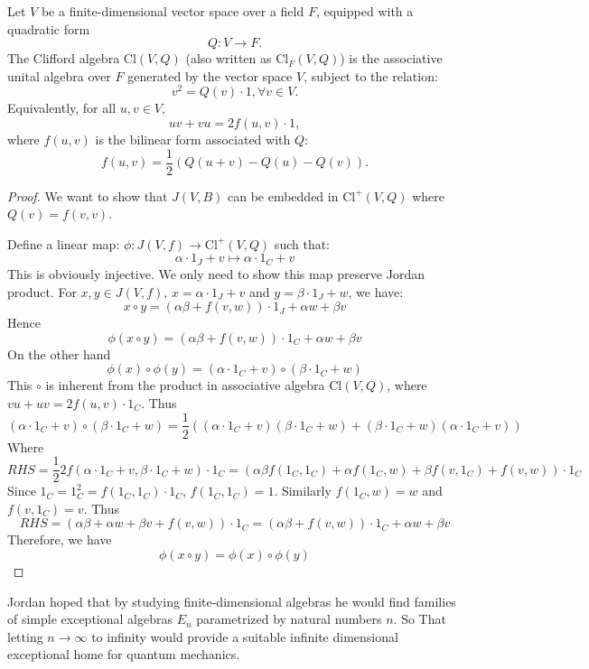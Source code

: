 \documentclass{article}
\begin{document}
\begin{definition} 
Let $ V $ be a finite-dimensional vector space over a field $ F $, equipped with a quadratic form
\[
Q : V \to F.
\]
The Clifford algebra $ \mathrm{Cl}(V, Q) $ (also written as $ \mathrm{Cl}_F(V, Q) $) is the associative unital algebra over $ F $ generated by the vector space $ V $, subject to the relation:
\[
v^2 = Q(v) \cdot 1 , \forall  v \in V.
\]
Equivalently, for all $ u, v \in V $,
\[
uv + vu = 2 f(u,v) \cdot 1,
\]
where $ f(u,v) $ is the bilinear form associated with $ Q $:
\[
f(u,v) = \frac{1}{2}(Q(u+v) - Q(u) - Q(v)).
\]
\end{definition}

\begin{proof} 
We want to show that $ J(V,B) $ can be embedded in $ \mathrm{Cl}^+(V, Q) $ where $ Q(v)=f(v,v) $.     

Define a linear map: $ \phi: J(V,f) \rightarrow \mathrm{Cl}^+(V, Q) $ such that:
\[
\alpha \cdot 1_J + v \mapsto \alpha \cdot 1_C + v
\] 
This is obviously injective. We only need to show this map preserve Jordan product. For $ x,y \in J(V,f) $, $ x=\alpha \cdot 1_J + v $ and $ y=\beta \cdot 1_J + w $, we have:
\[
x \circ y = (\alpha \beta + f(v,w)) \cdot 1_J + \alpha w + \beta v 
\]
Hence
\[
\phi(x \circ y) = (\alpha \beta + f(v,w)) \cdot 1_C + \alpha w + \beta v 
\]
On the other hand
\[
\phi(x) \circ \phi(y) = (\alpha \cdot 1_C + v) \circ (\beta \cdot 1_C + w )
\]
This $ \circ $ is inherent from the product in associative algebra $ \mathrm{Cl}(V,Q) $, where $ vu+uv=2f(u,v) \cdot 1_C $. Thus
\[
(\alpha \cdot 1_C + v) \circ (\beta \cdot 1_C + w )=\frac{1}{2}((\alpha \cdot 1_C + v)(\beta \cdot 1_C + w )+(\beta \cdot 1_C + w )(\alpha \cdot 1_C + v))
\]    
Where
\[
RHS=\frac{1}{2}2f(\alpha \cdot 1_C + v,\beta \cdot 1_C + w ) \cdot 1_C=(\alpha \beta f(1_C,1_C)+\alpha f(1_C,w) +\beta f(v,1_C)+f(v,w)) \cdot 1_C
\]
Since $ 1_C=1_C^2=f(1_C,1_C) \cdot 1_C $, $ f(1_C,1_C)=1 $. Similarly $ f(1_C,w)=w $ and $f(v,1_C)=v $. Thus
\[
RHS=(\alpha \beta+\alpha w + \beta v +f(v,w)) \cdot 1_C=(\alpha \beta + f(v,w)) \cdot 1_C + \alpha w + \beta v
\]
Therefore, we have
\[
\phi(x \circ y)=\phi(x) \circ \phi(y)
\]  
\end{proof}

Jordan hoped that by studying finite-dimensional algebras he would find families of simple exceptional algebras $E_n$ parametrized by natural numbers $n$. So That letting $n \to \infty$ to infinity would provide a suitable infinite dimensional exceptional home for quantum mechanics.
\end{document}
